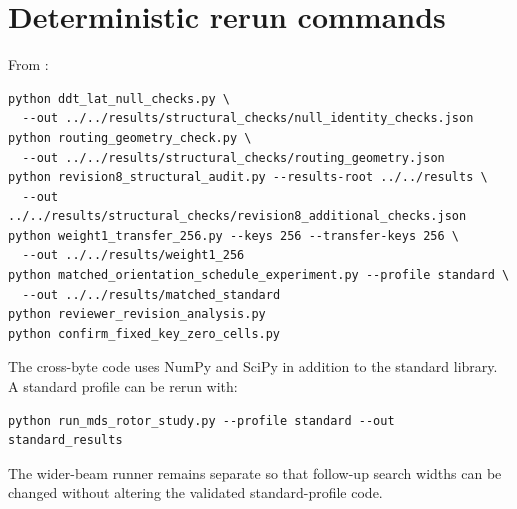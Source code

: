 \documentclass[cryptography,supfile,submit,oneauthor]{Definitions/mdpi}
\begin{document}
\section{Deterministic rerun commands}
From :
\begin{verbatim}
python ddt_lat_null_checks.py \
  --out ../../results/structural_checks/null_identity_checks.json
python routing_geometry_check.py \
  --out ../../results/structural_checks/routing_geometry.json
python revision8_structural_audit.py --results-root ../../results \
  --out ../../results/structural_checks/revision8_additional_checks.json
python weight1_transfer_256.py --keys 256 --transfer-keys 256 \
  --out ../../results/weight1_256
python matched_orientation_schedule_experiment.py --profile standard \
  --out ../../results/matched_standard
python reviewer_revision_analysis.py
python confirm_fixed_key_zero_cells.py
\end{verbatim}
The cross-byte code uses NumPy and SciPy in addition to the standard library. A standard profile can be rerun with:
\begin{verbatim}
python run_mds_rotor_study.py --profile standard --out standard_results
\end{verbatim}
The wider-beam runner remains separate so that follow-up search widths can be changed without altering the validated standard-profile code.
\end{document}
